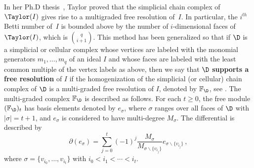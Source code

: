 In her Ph.D thesis~\cite{T}, Taylor proved that the simplicial chain
complex of $\Taylor(I)$ gives rise to a multigraded free resolution of~$I$. 
In particular, the $i^{th}$ Betti number of~$I$ is bounded above
by the number of $i$-dimensional faces of $\Taylor(I)$, which is
$\binom{q}{i+1}$.  This method has been generalized so that if
$\D$ is a simplicial or cellular complex whose vertices are
labeled with the monomial generators $m_1, \ldots , m_q$ of an ideal
$I$ and whose faces are labeled with the least common multiple of the
vertex labels as above, then we say that $\D$ {\bf supports a free
resolution} of $I$ if the homogenization of the  simplicial \textup{(}or cellular\textup{)} chain complex of $\D$ is a multi-graded free resolution of $I$, denoted by $\mathbb F_{\D}$, see \cite{BPS, BS}. The multi-graded complex $\mathbb F_{\D}$ is described as follows. For each $t\ge 0$, the free module $(\mathbb F_{\D})_t$ has basis elements denoted by $e_\sigma$, where $\sigma$ ranges over all faces of $\D$ with $|\sigma|=t+1$, and $e_{\sigma}$ is considered to have multi-degree $M_{\sigma}$. The differential is described by
\begin{equation}
\label{e:Taylor-diff}
\partial(e_\sigma)=\sum_{j=0}^t(-1)^j\frac{M_{\sigma}}{M_{\sigma\smallsetminus\{v_{i_j}\}}} e_{\sigma\smallsetminus\{v_{i_j}\}}\,,
\end{equation}
where $\sigma=\{v_{i_0}, \dots, v_{i_t}\}$ with $i_0 < i_1 < \cdots < i_t$. 




